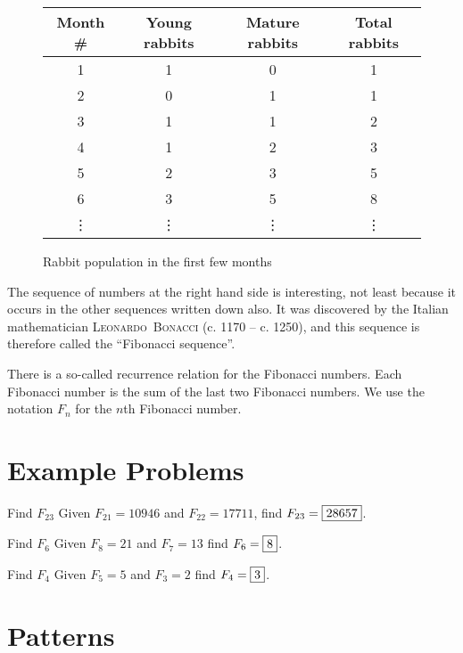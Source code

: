 \documentclass[a4paper,10pt]{report}
\begin{document}
\begin{figure}
 \begin{tabular}{|c|c|c|c|}
  \hline
  Month \# & Young rabbits & Mature rabbits & Total rabbits \\
  \hline
  1 & 1 & 0 & 1 \\
  2 & 0 & 1 & 1 \\
  3 & 1 & 1 & 2 \\
  4 & 1 & 2 & 3 \\
  5 & 2 & 3 & 5 \\
  6 & 3 & 5 & 8 \\
  \vdots & \vdots & \vdots & \vdots \\
  \hline
 \end{tabular}

 \caption{Rabbit population in the first few months}

 \label{fib:rabbit}
\end{figure}

The sequence of numbers at the right hand side is interesting, not least
because it occurs in the other sequences written down also. It was discovered
by the Italian mathematician \textsc{Leonardo~Bonacci} (c. 1170 -- c. 1250),
and this sequence is therefore called the ``Fibonacci sequence''.

There is a so-called recurrence relation for the Fibonacci numbers. Each
Fibonacci number is the sum of the last two Fibonacci numbers. We use the
notation \(F_n\) for the \(n\)th Fibonacci number.

\section{Example Problems}

\begin{problem}{Find \(F_{23}\)}
 Given \(F_{21}=10946\) and \(F_{22}=17711\), find \(F_{23}=\Ans{28657}\).
\end{problem}

\begin{problem}{Find $F_6$}
 Given $F_8=21$ and $F_7=13$ find $F_6=\Ans{8}$.
\end{problem}

\begin{problem}{Find $F_4$}
 Given $F_5=5$ and $F_3=2$ find $F_4=\Ans{3}$.
\end{problem}

\section{Patterns}
\end{document}
